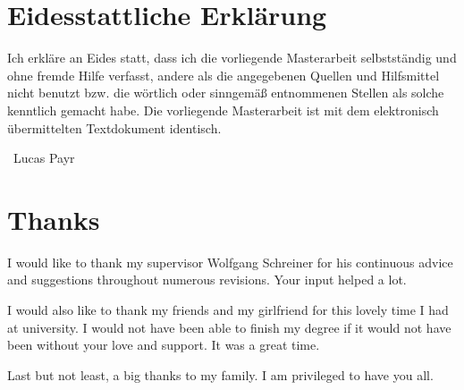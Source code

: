 \newpage

\section*{Eidesstattliche Erklärung}

Ich erkläre an Eides statt, dass ich die vorliegende Masterarbeit selbstständig und ohne fremde Hilfe verfasst, andere als die angegebenen Quellen und Hilfsmittel nicht benutzt bzw. die wörtlich oder sinngemäß entnommenen Stellen als solche kenntlich gemacht habe.
Die vorliegende Masterarbeit ist mit dem elektronisch übermittelten Textdokument identisch.

\vspace*{20mm}


\makebox[.5\linewidth][r]{}\dotsign\smallskip\newline
\hspace*{.5\linewidth}\ Lucas Payr
\newpage

\section*{Thanks}

I would like to thank my supervisor Wolfgang Schreiner for his continuous advice and suggestions throughout numerous revisions. Your input helped a lot.

I would also like to thank my friends and my girlfriend for this lovely time I had at university. I would not have been able to finish my degree if it would not have been without your love and support. It was a great time.

Last but not least, a big thanks to my family. I am privileged to have you all.